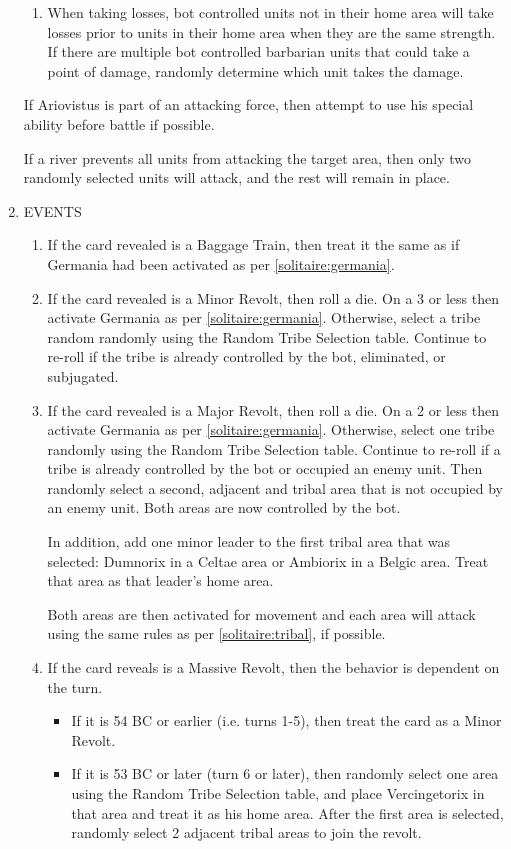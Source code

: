\begin{enumerate}
\begin{enumerate}[leftmargin=0in]
    \item When taking losses, bot controlled units not in their home area will take losses prior to units in their home area when they are the same strength. If there are multiple bot controlled barbarian units that could take a point of damage, randomly determine which unit takes the damage.
  \end{enumerate}
  
  If Ariovistus is part of an attacking force, then attempt to use his special ability before battle if possible.

  If a river prevents all units from attacking the target area, then only two randomly selected units will attack, and the rest will remain in place.

  \item EVENTS
  \begin{enumerate}[leftmargin=0in]
    \item If the card revealed is a Baggage Train, then treat it the same as if Germania had been activated as per \ref{solitaire:germania}.
    
    \item If the card revealed is a Minor Revolt, then roll a die. On a 3 or less then activate Germania as per \ref{solitaire:germania}. Otherwise, select a tribe random randomly using the Random Tribe Selection table. Continue to re-roll if the tribe is already controlled by the bot, eliminated, or subjugated.
  
    \item If the card revealed is a Major Revolt, then roll a die. On a 2 or less then activate Germania as per \ref{solitaire:germania}. Otherwise, select one tribe randomly using the Random Tribe Selection table. Continue to re-roll if a tribe is already controlled by the bot or occupied an enemy unit. Then randomly select a second, adjacent and tribal area that is not occupied by an enemy unit. Both areas are now controlled by the bot.
  
    In addition, add one minor leader to the first tribal area that was selected: Dumnorix in a Celtae area or Ambiorix in a Belgic area. Treat that area as that leader's home area.
  
    Both areas are then activated for movement and each area will attack using the same rules as per \ref{solitaire:tribal}, if possible.
  
    \item If the card reveals is a Massive Revolt, then the behavior is dependent on the turn.
    \begin{itemize}
      \item If it is 54 BC or earlier (i.e. turns 1-5), then treat the card as a Minor Revolt.
      \item If it is 53 BC or later (turn 6 or later), then randomly select one area using the Random Tribe Selection table, and place Vercingetorix in that area and treat it as his home area. After the first area is selected, randomly select 2 adjacent tribal areas to join the revolt.
    \end{itemize}
  \end{enumerate}
  

\end{enumerate}
